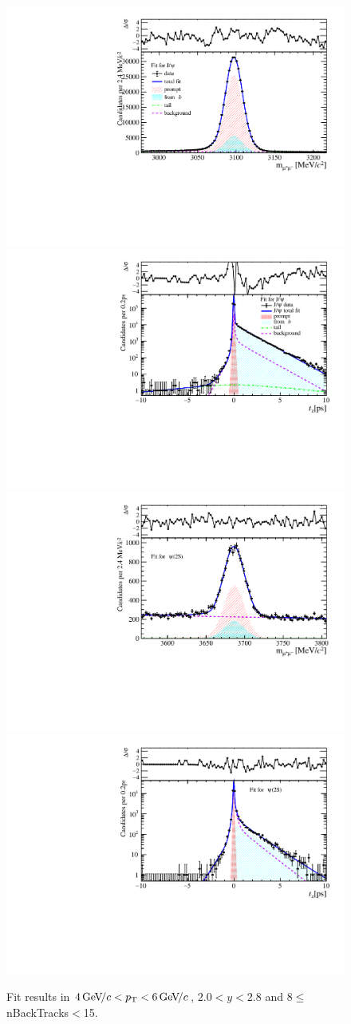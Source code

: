 \begin{figure}[H]
\begin{center}
\includegraphics[width=0.47\linewidth]{pdf/Jpsi/drawmassB/n2y1pt3.pdf}
\includegraphics[width=0.47\linewidth]{pdf/Jpsi/2DFitB/n2y1pt3.pdf}
\vspace*{-0.5cm}
\includegraphics[width=0.47\linewidth]{pdf/Psi2S/drawmassB/n2y1pt3.pdf}
\includegraphics[width=0.47\linewidth]{pdf/Psi2S/2DFitB/n2y1pt3.pdf}
\vspace*{-0.5cm}
\end{center}
\caption{Fit results in $4\text{\,Ge\kern -0.1em V\!/}c<p_{\mathrm{T}}<6\text{\,Ge\kern -0.1em V\!/}c$, $2.0<y<2.8$ and 8$\leq$nBackTracks$<$15.}
\label{Fitn2y1pt3}
\end{figure}
